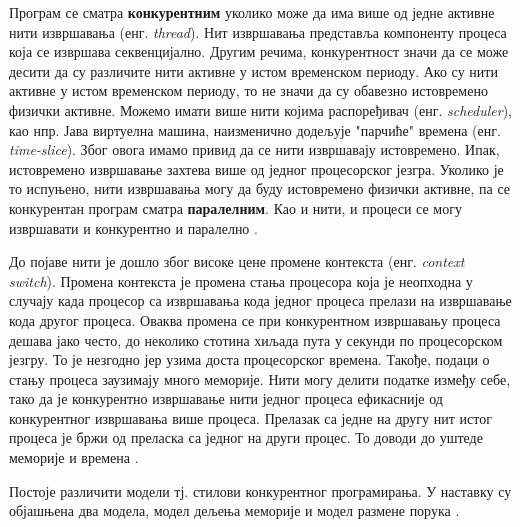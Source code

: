 \documentclass[12pt,oneside]{memoir}
\begin{document}
Програм се сматра \textbf{конкурентним} уколико може да има више од једне активне нити извршавања  (енг. \textit{thread}). Нит извршавања представља компоненту процеса која се извршава секвенцијално. Другим речима, конкурентност значи да се може десити да су различите нити активне у истом временском периоду. Ако су нити активне у истом временском периоду, то не значи да су обавезно истовремено физички активне. Можемо имати више нити којима распоређивач (енг. \textit{scheduler}), као нпр. Јава виртуелна машина, наизменично додељује "парчиће" времена (енг. \textit{time-slice}). Због овога имамо привид да се нити извршавају истовремено. Ипак, истовремено извршавање захтева више од једног процесорског језгра. Уколико је то испуњено, нити извршавања могу да буду истовремено физички активне, па се конкурентан програм сматра \textbf{паралелним}. Као и нити, и процеси се могу извршавати и конкурентно и паралелно \cite{progLangPragm, konkMalkov}.

До појаве нити је дошло због високе цене промене контекста (енг. \textit{context switch}). Промена контекста је промена стања процесора која је неопходна у случају када процесор са извршавања кода једног процеса прелази на извршавање кода другог процеса. Оваква промена се при конкурентном извршавању процеса дешава јако често, до неколико стотина хиљада пута у секунди по процесорском језгру. То је незгодно јер узима доста процесорског времена. Такође, подаци о стању процеса заузимају много меморије. Нити могу делити податке између себе, тако да је конкурентно извршавање нити једног процеса ефикасније од конкурентног извршавања више процеса. Прелазак са једне на другу нит истог процеса је бржи од преласка са једног на други процес. То доводи до уштеде меморије и времена  \cite{progLangPragm, konkMalkov, survey}.

Постоје различити модели тј. стилови конкурентног програмирања. У наставку су објашњена два модела, модел дељења меморије и модел размене порука \cite{survey}.
 
\end{document}

